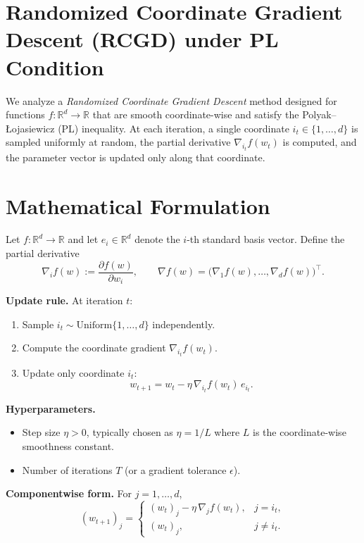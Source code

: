 \documentclass{article}
\begin{document}
\section*{Randomized Coordinate Gradient Descent (RCGD) under PL Condition}

We analyze a \emph{Randomized Coordinate Gradient Descent} method designed for
functions $f:\mathbb{R}^d \to \mathbb{R}$ that are smooth coordinate-wise and
satisfy the Polyak--\L ojasiewicz (PL) inequality. At each iteration, a single
coordinate $i_t \in \{1,\dots,d\}$ is sampled uniformly at random, the partial
derivative $\nabla_{i_t} f(w_t)$ is computed, and the parameter vector is updated
only along that coordinate.

\section*{Mathematical Formulation}

Let $f:\mathbb{R}^d \to \mathbb{R}$ and let $e_i \in \mathbb{R}^d$ denote the
$i$-th standard basis vector. Define the partial derivative
\[
\nabla_i f(w) := \frac{\partial f(w)}{\partial w_i}, \qquad
\nabla f(w) = \big(\nabla_1 f(w), \dots, \nabla_d f(w)\big)^\top .
\]

\noindent\textbf{Update rule.} At iteration $t$:
\begin{enumerate}
\item Sample $i_t \sim \mathrm{Uniform}\{1,\dots,d\}$ independently.
\item Compute the coordinate gradient $\nabla_{i_t} f(w_t)$.
\item Update only coordinate $i_t$:
\[
w_{t+1} = w_t - \eta\, \nabla_{i_t} f(w_t)\, e_{i_t}.
\]
\end{enumerate}

\noindent\textbf{Hyperparameters.}
\begin{itemize}
\item Step size $\eta > 0$, typically chosen as $\eta = 1/L$ where $L$ is the
coordinate-wise smoothness constant.
\item Number of iterations $T$ (or a gradient tolerance $\epsilon$).
\end{itemize}

\noindent\textbf{Componentwise form.} For $j = 1,\dots,d$,
\[
(w_{t+1})_j =
\begin{cases}
(w_t)_j - \eta\, \nabla_j f(w_t), & j = i_t,\\[4pt]
(w_t)_j, & j \neq i_t.
\end{cases}
\]
\end{document}
